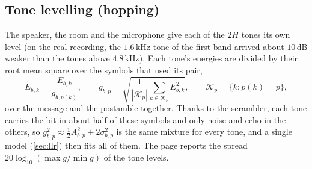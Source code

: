 \documentclass[11pt,a4paper]{article}
\newcommand{\kHz}{\,\mathrm{kHz}}
\newcommand{\dB}{\,\mathrm{dB}}
\theoremstyle{remark}
\begin{document}
\subsection{Tone levelling (hopping)}
\label{sec:level}
The speaker, the room and the microphone give each of the $2H$ tones its own level (on the real recording, the $1.6\kHz$ tone of the first band arrived about $10\dB$ weaker than the tones above $4.8\kHz$). Each tone's energies are divided by their root mean square over the symbols that used its pair,
\begin{equation}
\tilde E_{b,k} = \frac{E_{b,k}}{g_{b,p(k)}}, \qquad g_{b,p} = \sqrt{\frac{1}{|\mathcal K_p|} \sum_{k \in \mathcal K_p} E_{b,k}^2}, \qquad \mathcal K_p = \{k : p(k) = p\},
\end{equation}
over the message and the postamble together. Thanks to the scrambler, each tone carries the bit in about half of these symbols and only noise and echo in the others, so $g_{b,p}^2 \approx \tfrac12 A_{b,p}^2 + 2\sigma_{b,p}^2$ is the same mixture for every tone, and a single model (\cref{sec:llr}) then fits all of them. The page reports the spread $20\log_{10}(\max g / \min g)$ of the tone levels.
\end{document}

